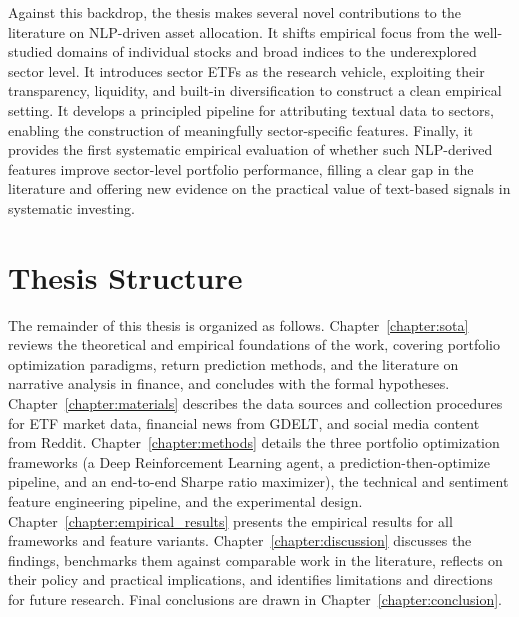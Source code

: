 Against this backdrop, the thesis makes several novel contributions to the literature on NLP-driven asset allocation. It shifts empirical focus from the well-studied domains of individual stocks and broad indices to the underexplored sector level. It introduces sector ETFs as the research vehicle, exploiting their transparency, liquidity, and built-in diversification to construct a clean empirical setting. It develops a principled pipeline for attributing textual data to sectors, enabling the construction of meaningfully sector-specific features. Finally, it provides the first systematic empirical evaluation of whether such NLP-derived features improve sector-level portfolio performance, filling a clear gap in the literature and offering new evidence on the practical value of text-based signals in systematic investing.


\section{Thesis Structure}

The remainder of this thesis is organized as follows. Chapter~\ref{chapter:sota} reviews the theoretical and empirical foundations of the work, covering portfolio optimization paradigms, return prediction methods, and the literature on narrative analysis in finance, and concludes with the formal hypotheses. Chapter~\ref{chapter:materials} describes the data sources and collection procedures for ETF market data, financial news from GDELT, and social media content from Reddit. Chapter~\ref{chapter:methods} details the three portfolio optimization frameworks (a Deep Reinforcement Learning agent, a prediction-then-optimize pipeline, and an end-to-end Sharpe ratio maximizer), the technical and sentiment feature engineering pipeline, and the experimental design. Chapter~\ref{chapter:empirical_results} presents the empirical results for all frameworks and feature variants. Chapter~\ref{chapter:discussion} discusses the findings, benchmarks them against comparable work in the literature, reflects on their policy and practical implications, and identifies limitations and directions for future research. Final conclusions are drawn in Chapter~\ref{chapter:conclusion}.

